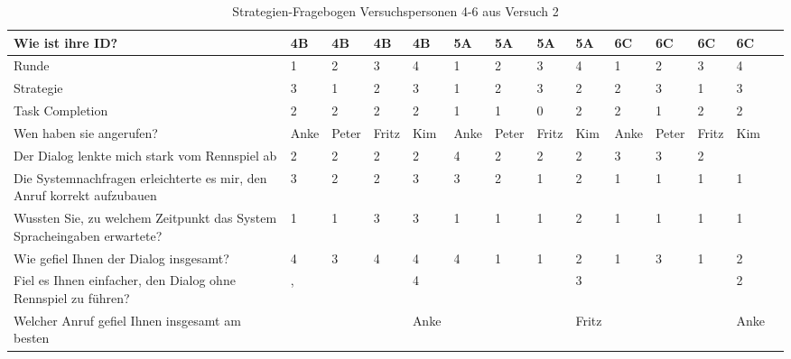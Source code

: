 \documentclass[12pt,a4paper]{scrartcl}
\begin{document}
\begin{appendix}
\begin{table}
\caption{Strategien-Fragebogen Versuchspersonen 4-6 aus Versuch 2}
\begin{tabular}{|p{6cm}| p{0.8cm} | p{0.8cm} | p{0.8cm} | p{0.8cm} || p{0.8cm} | p{0.8cm} | p{0.8cm} | p{0.8cm} || p{0.8cm} | p{0.8cm} | p{0.8cm} | p{0.8cm} | p{} | }
\hline
	Wie ist ihre ID? & 4B & 4B & 4B & 4B & 5A & 5A & 5A & 5A & 6C & 6C & 6C & 6C \\ \hline \hline
	Runde & 1 & 2 & 3 & 4 & 1 & 2 & 3 & 4 & 1 & 2 & 3 & 4 \\ \hline
	Strategie & 3 & 1 & 2 & 3 & 1 & 2 & 3 & 2 & 2 & 3 & 1 & 3 \\ \hline \hline
	Task Completion & 2 & 2 & 2 & 2 & 1 & 1 & 0 & 2 & 2 & 1 & 2 & 2 \\ \hline \hline
	Wen haben sie angerufen? & Anke & Peter & Fritz & Kim & Anke & Peter & Fritz & Kim & Anke & Peter & Fritz & Kim \\ \hline
	Der Dialog lenkte mich stark vom Rennspiel ab & 2 & 2 & 2 & 2 & 4 & 2 & 2 & 2 & 3 & 3 & 2 &  \\ \hline
	Die Systemnachfragen erleichterte es mir, den Anruf korrekt aufzubauen & 3 & 2 & 2 & 3 & 3 & 2 & 1 & 2 & 1 & 1 & 1 & 1 \\ \hline
	Wussten Sie, zu welchem Zeitpunkt das System Spracheingaben erwartete? & 1 & 1 & 3 & 3 & 1 & 1 & 1 & 2 & 1 & 1 & 1 & 1 \\ \hline
	Wie gefiel Ihnen der Dialog insgesamt? & 4 & 3 & 4 & 4 & 4 & 1 & 1 & 2 & 1 & 3 & 1 & 2 \\ \hline
	Fiel es Ihnen einfacher, den Dialog ohne Rennspiel zu führen? & , &  &  & 4 &  &  &  & 3 &  &  &  & 2 \\ \hline
	Welcher Anruf gefiel Ihnen insgesamt am besten &  &  &  & Anke &  &  &  & Fritz &  &  &  & Anke \\ \hline
\end{tabular}
\end{table}


\end{appendix}
\end{document}
